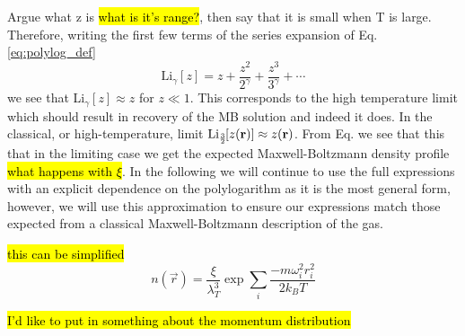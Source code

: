Argue what z is \hl{what is it's range?}, then say that it is small when T is large. Therefore, writing the first few terms of the series expansion of Eq.\ref{eq:polylog_def}
	\begin{equation}
	\text{Li}_{\gamma}[z] = z + \frac{z^2}{2^{\gamma}} + \frac{z^3}{3^{\gamma}} + \cdots
	\end{equation}
we see that Li$_{\gamma}[z] \approx z$ for $z \ll 1$. This corresponds to the high temperature limit which should result in recovery of the MB solution and indeed it does.
In the classical, or high-temperature, limit $\text{Li}_{\scriptscriptstyle\frac{3}{2}\!}\!\left[ z(\mathbf{r}) \right] \approx z(\mathbf{r})$. From Eq. we see that this that in the limiting case we get the expected Maxwell-Boltzmann density profile \hl{what happens with $\xi$}. In the following we will continue to use the full expressions with an explicit dependence on the polylogarithm as it is the most general form, however, we will use this approximation to ensure our expressions match those expected from a classical Maxwell-Boltzmann description of the gas.

\hl{this can be simplified}
\begin{equation}
n(\vec{r}) = \frac{\xi}{\lambda_T^3}\exp{\sum_i\frac{-m\omega_i^2r_i^2}{2 k_B T}}
\end{equation}

\hl{I'd like to put in something about the momentum distribution}


